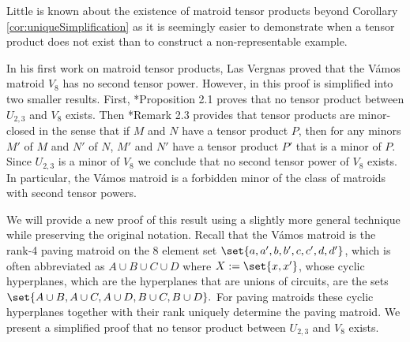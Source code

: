     Little is known about the existence of matroid tensor products beyond Corollary \ref{cor:uniqueSimplification} as it is seemingly easier to demonstrate when a tensor product does not exist than to construct a non-representable example.
    
    In his first work on matroid tensor products, Las Vergnas proved that the V\'amos matroid $V_8$ has no second tensor power. However, in \cite{LV81} this proof is simplified into two smaller results. First, \cite{LV81}*{Proposition 2.1} proves that no tensor product between $U_{2,3}$ and $V_8$ exists. Then \cite{LV81}*{Remark 2.3} provides that tensor products are minor-closed in the sense that if $M$ and $N$ have a tensor product $P$, then for any minors $M'$ of $M$ and $N'$ of $N$, $M'$ and $N'$ have a tensor product $P'$ that is a minor of $P$. Since $U_{2,3}$ is a minor of $V_8$ we conclude that no second tensor power of $V_8$ exists. In particular, the V\'amos matroid is a forbidden minor of the class of matroids with second tensor powers.

    We will provide a new proof of this result using a slightly more general technique while preserving the original notation. Recall that the V\'amos matroid is the rank-4 paving matroid on the $8$ element set $\set{a, a', b, b', c, c', d, d'}$, which is often abbreviated as $A\cup B\cup C\cup D$ where $X:=\set{x,x'}$, whose cyclic hyperplanes, which are the hyperplanes that are unions of circuits, are the sets $\set{A\cup B, A\cup C, A\cup D, B\cup C, B\cup D}.$ For paving matroids these cyclic hyperplanes together with their rank uniquely determine the paving matroid. We present a simplified proof that no tensor product between $U_{2,3}$ and $V_8$ exists.

